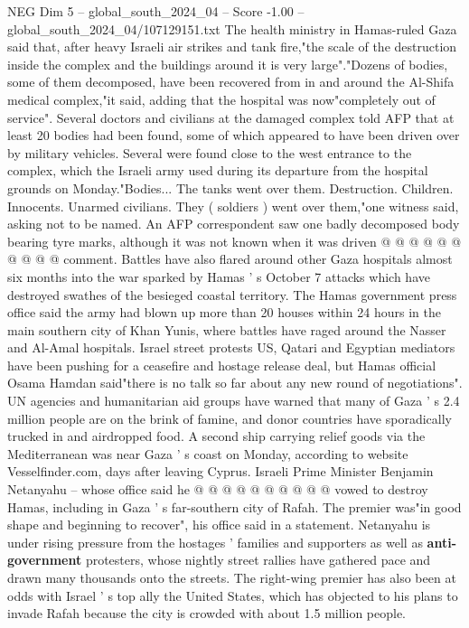 \begin{textsample}{NEG Dim 5 – global\_south\_2024\_04 – Score -1.00 – global\_south\_2024\_04/107129151.txt}  \label{ex:f5_neg_111}
The health ministry in Hamas-ruled Gaza said that, after heavy Israeli air strikes and tank fire,"the scale of the destruction inside the complex and the buildings around it is very large"."Dozens of bodies, some of them decomposed, have been recovered from in and around the Al-Shifa medical complex,"it said, adding that the hospital was now"completely out of service".
Several doctors and civilians at the damaged complex told AFP that at least 20 bodies had been found, some of which appeared to have been driven over by military vehicles.
Several were found close to the west entrance to the complex, which the Israeli army used during its departure from the hospital grounds on Monday."Bodies...
The tanks went over them.
Destruction.
Children.
Innocents.
Unarmed civilians.
They ( soldiers ) went over them,"one witness said, asking not to be named.
An AFP correspondent saw one badly decomposed body bearing tyre marks, although it was not known when it was driven @ @ @ @ @ @ @ @ @ @ comment.
Battles have also flared around other Gaza hospitals almost six months into the war sparked by Hamas ' s October 7 attacks which have destroyed swathes of the besieged coastal territory.
The Hamas government press office said the army had blown up more than 20 houses within 24 hours in the main southern city of Khan Yunis, where battles have raged around the Nasser and Al-Amal hospitals.
Israel street protests US, Qatari and Egyptian mediators have been pushing for a ceasefire and hostage release deal, but Hamas official Osama Hamdan said"there is no talk so far about any new round of negotiations".
UN agencies and humanitarian aid groups have warned that many of Gaza ' s 2.4 million people are on the brink of famine, and donor countries have sporadically trucked in and airdropped food.
A second ship carrying relief goods via the Mediterranean was near Gaza ' s coast on Monday, according to website Vesselfinder.com, days after leaving Cyprus.
Israeli Prime Minister Benjamin Netanyahu -- whose office said he @ @ @ @ @ @ @ @ @ @ vowed to destroy Hamas, including in Gaza ' s far-southern city of Rafah.
The premier was"in good shape and beginning to recover", his office said in a statement.
Netanyahu is under rising pressure from the hostages ' families and supporters as well as \textbf{anti-government} protesters, whose nightly street rallies have gathered pace and drawn many thousands onto the streets.
The right-wing premier has also been at odds with Israel ' s top ally the United States, which has objected to his plans to invade Rafah because the city is crowded with about 1.5 million people.

\end{textsample}
